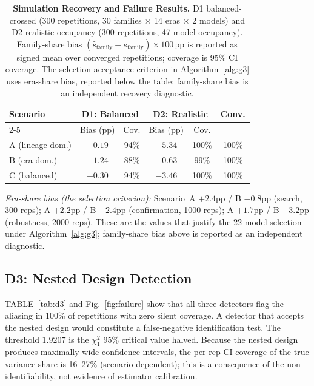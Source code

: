 \documentclass{ieeeaccess}
\theoremstyle{definition}
\theoremstyle{plain}
\begin{document}
\begin{table}[!htbp]
\caption{\textbf{Simulation Recovery and Failure Results.} D1 balanced-crossed (300 repetitions, 30 families $\times$ 14 eras $\times$ 2 models) and D2 realistic occupancy (300 repetitions, 47-model occupancy). Family-share bias $(\hat{s}_{\text{family}} - s_{\text{family}}) \times 100\,\mathrm{pp}$ is reported as signed mean over converged repetitions; coverage is 95\% CI coverage. The selection acceptance criterion in Algorithm~\ref{alg:g3} uses era-share bias, reported below the table; family-share bias is an independent recovery diagnostic.}
\label{tab:d1}
\centering
\scriptsize
\begin{tabular}{l cc cc c}
\hline
\textbf{Scenario} & \multicolumn{2}{c}{\textbf{D1: Balanced}} & \multicolumn{2}{c}{\textbf{D2: Realistic}} & \textbf{Conv.} \\
\cline{2-5}
 & Bias (pp) & Cov. & Bias (pp) & Cov. & \\
\hline
A (lineage-dom.) & $+0.19$ & 94\% & $-5.34$ & 100\% & 100\% \\
\hline
B (era-dom.) & $+1.24$ & 88\% & $-0.63$ & 99\% & 100\% \\
\hline
C (balanced) & $-0.30$ & 94\% & $-3.46$ & 100\% & 100\% \\
\hline
\end{tabular}
\par\vspace{3pt}
\scriptsize
\textit{Era-share bias (the selection criterion):} Scenario~A $+2.4$pp / B $-0.8$pp (search, 300 reps); A $+2.2$pp / B $-2.4$pp (confirmation, 1000 reps); A $+1.7$pp / B $-3.2$pp (robustness, 2000 reps). These are the values that justify the 22-model selection under Algorithm~\ref{alg:g3}; family-share bias above is reported as an independent diagnostic.
\end{table}



\subsection{D3: Nested Design Detection}
TABLE~\ref{tab:d3} and Fig.~\ref{fig:failure} show that all three detectors flag the aliasing in 100\% of repetitions with zero silent coverage. A detector that accepts the nested design would constitute a false-negative identification test. The threshold $1.9207$ is the $\chi^2_1$ 95\% critical value halved. Because the nested design produces maximally wide confidence intervals, the per-rep CI coverage of the true variance share is 16--27\% (scenario-dependent); this is a consequence of the non-identifiability, not evidence of estimator calibration.
\end{document}
